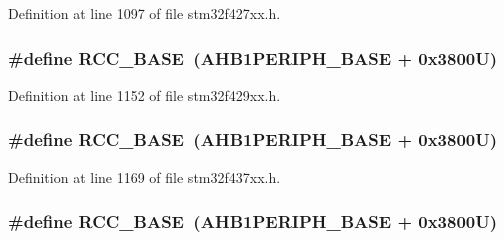 Definition at line 1097 of file stm32f427xx.\+h.

\subsubsection[{\texorpdfstring{R\+C\+C\+\_\+\+B\+A\+SE}{RCC_BASE}}]{\setlength{\rightskip}{0pt plus 5cm}\#define R\+C\+C\+\_\+\+B\+A\+SE~({\bf A\+H\+B1\+P\+E\+R\+I\+P\+H\+\_\+\+B\+A\+SE} + 0x3800\+U)}\hypertarget{group___peripheral__memory__map_ga0e681b03f364532055d88f63fec0d99d}{}\label{group___peripheral__memory__map_ga0e681b03f364532055d88f63fec0d99d}


Definition at line 1152 of file stm32f429xx.\+h.

\subsubsection[{\texorpdfstring{R\+C\+C\+\_\+\+B\+A\+SE}{RCC_BASE}}]{\setlength{\rightskip}{0pt plus 5cm}\#define R\+C\+C\+\_\+\+B\+A\+SE~({\bf A\+H\+B1\+P\+E\+R\+I\+P\+H\+\_\+\+B\+A\+SE} + 0x3800\+U)}\hypertarget{group___peripheral__memory__map_ga0e681b03f364532055d88f63fec0d99d}{}\label{group___peripheral__memory__map_ga0e681b03f364532055d88f63fec0d99d}


Definition at line 1169 of file stm32f437xx.\+h.

\subsubsection[{\texorpdfstring{R\+C\+C\+\_\+\+B\+A\+SE}{RCC_BASE}}]{\setlength{\rightskip}{0pt plus 5cm}\#define R\+C\+C\+\_\+\+B\+A\+SE~({\bf A\+H\+B1\+P\+E\+R\+I\+P\+H\+\_\+\+B\+A\+SE} + 0x3800\+U)}\hypertarget{group___peripheral__memory__map_ga0e681b03f364532055d88f63fec0d99d}{}\label{group___peripheral__memory__map_ga0e681b03f364532055d88f63fec0d99d}


